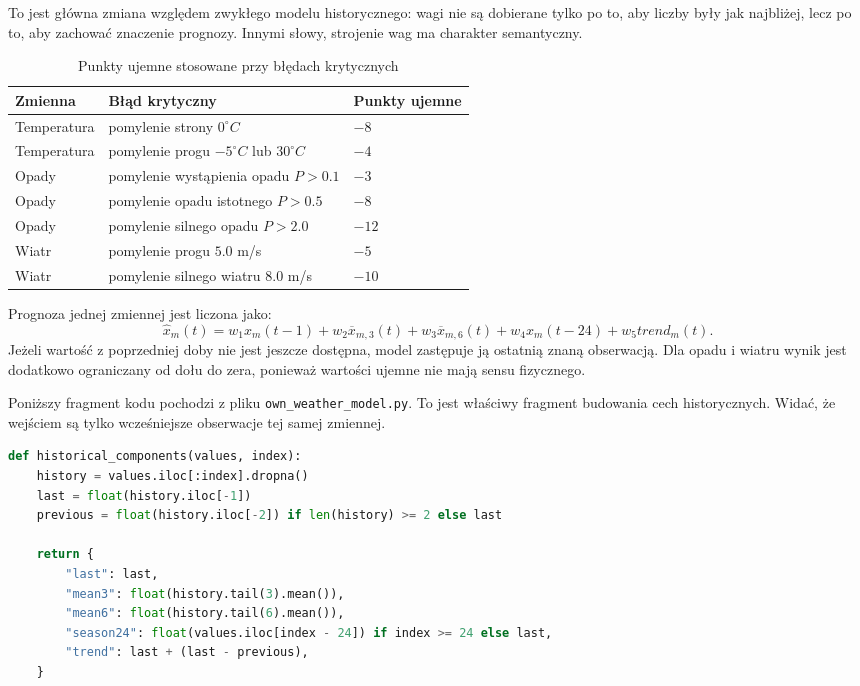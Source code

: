 \documentclass[a4paper,12pt]{article}
\begin{document}
\noindent
To jest główna zmiana względem zwykłego modelu historycznego: wagi nie są
dobierane tylko po to, aby liczby były jak najbliżej, lecz po to, aby zachować
znaczenie prognozy. Innymi słowy, strojenie wag ma charakter semantyczny.

\begin{table}[h]
\centering
\caption{Punkty ujemne stosowane przy błędach krytycznych}
\small
\begin{tabularx}{\textwidth}{p{3.6cm}p{4.2cm}X}
\toprule
Zmienna & Błąd krytyczny & Punkty ujemne \\
\midrule
Temperatura & pomylenie strony \(0^\circ C\) & \(-8\) \\
Temperatura & pomylenie progu \(-5^\circ C\) lub \(30^\circ C\) & \(-4\) \\
Opady & pomylenie wystąpienia opadu \(P>0.1\) & \(-3\) \\
Opady & pomylenie opadu istotnego \(P>0.5\) & \(-8\) \\
Opady & pomylenie silnego opadu \(P>2.0\) & \(-12\) \\
Wiatr & pomylenie progu \(5.0\) m/s & \(-5\) \\
Wiatr & pomylenie silnego wiatru \(8.0\) m/s & \(-10\) \\
\bottomrule
\end{tabularx}
\normalsize
\end{table}

\noindent
Prognoza jednej zmiennej jest liczona jako:
\[
\hat{x}_m(t) =
w_1 x_m(t-1) +
w_2 \overline{x}_{m,3}(t) +
w_3 \overline{x}_{m,6}(t) +
w_4 x_m(t-24) +
w_5 trend_m(t).
\]
Jeżeli wartość z poprzedniej doby nie jest jeszcze dostępna, model zastępuje ją
ostatnią znaną obserwacją. Dla opadu i wiatru wynik jest dodatkowo ograniczany
od dołu do zera, ponieważ wartości ujemne nie mają sensu fizycznego.

\noindent
Poniższy fragment kodu pochodzi z pliku \texttt{own\_weather\_model.py}. To
jest właściwy fragment budowania cech historycznych. Widać, że wejściem są
tylko wcześniejsze obserwacje tej samej zmiennej.

\begin{lstlisting}[language=Python]
def historical_components(values, index):
    history = values.iloc[:index].dropna()
    last = float(history.iloc[-1])
    previous = float(history.iloc[-2]) if len(history) >= 2 else last

    return {
        "last": last,
        "mean3": float(history.tail(3).mean()),
        "mean6": float(history.tail(6).mean()),
        "season24": float(values.iloc[index - 24]) if index >= 24 else last,
        "trend": last + (last - previous),
    }
\end{lstlisting}
\end{document}
